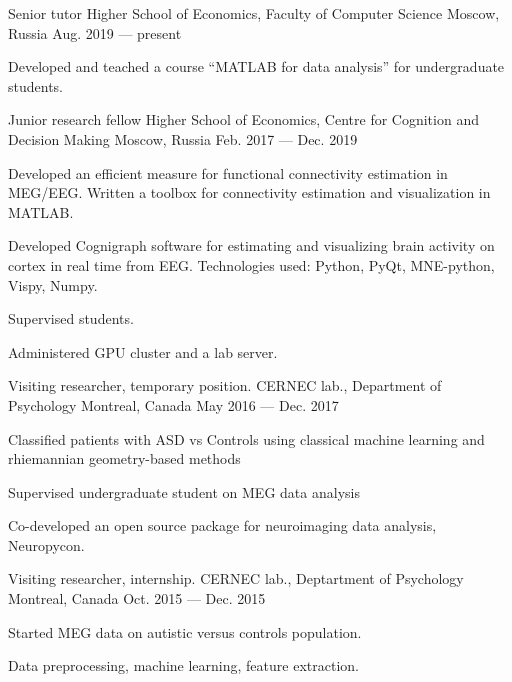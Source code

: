 
\begin{cventries}
  \cventry
    {Senior tutor}
    {Higher School of Economics, Faculty of Computer Science}
    {Moscow, Russia}
    {Aug. 2019 — present}
    {
      \begin{cvitems}
          \item Developed and teached a course ``MATLAB for data analysis'' for undergraduate students.
      \end{cvitems}
    }
  \cventry
    {Junior research fellow}
    {Higher School of Economics, Centre for Cognition and Decision Making}
    {Moscow, Russia}
    {Feb. 2017 — Dec. 2019}
    {
      \begin{cvitems}
        \item{Developed an efficient measure for functional connectivity estimation in MEG/EEG.
            Written a toolbox for connectivity estimation and visualization in MATLAB.}
        \item{Developed Cognigraph software for estimating and visualizing brain activity on cortex in real time from EEG. Technologies used: Python, PyQt, MNE-python, Vispy, Numpy.}
        \item{Supervised students.}
        \item{Administered GPU cluster and a lab server.}
      \end{cvitems}
    }
  \cventry
    {Visiting researcher, temporary position.}
    {CERNEC lab., Department of Psychology}
    {Montreal, Canada}
    {May 2016 — Dec. 2017}
    {
      \begin{cvitems}
          \item{Classified patients with ASD vs Controls using classical machine learning and
              rhiemannian geometry-based methods}
          \item{Supervised undergraduate student on MEG data analysis}
          \item{Co-developed an open source package for neuroimaging data
              analysis, Neuropycon.}
      \end{cvitems}
    }
  \cventry
    {Visiting researcher, internship.}
    {CERNEC lab., Deptartment of Psychology}
    {Montreal, Canada}
    {Oct. 2015 — Dec. 2015}
    {
      \begin{cvitems}
          \item {Started MEG data on autistic versus controls population.}
          \item{Data preprocessing, machine learning, feature extraction.}

\end{cvitems}}
\end{cventries}
